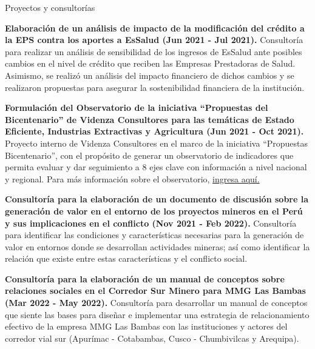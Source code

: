 \documentclass{resume} %
\begin{document}
\begin{rSection}{Proyectos y consultorías}
\item \textbf{Elaboración de un análisis de impacto de la modificación del crédito a la EPS contra los aportes a EsSalud (Jun 2021 - Jul 2021).} {Consultoría para realizar un análisis de sensibilidad de los ingresos de EsSalud ante posibles cambios en el nivel de crédito que reciben las Empresas Prestadoras de Salud. Asimismo, se realizó un análisis del impacto financiero de dichos cambios y se realizaron propuestas para asegurar la sostenibilidad financiera de la institución.}
\item \textbf{Formulación del Observatorio de la iniciativa “Propuestas del Bicentenario” de Videnza Consultores para las temáticas de Estado Eficiente, Industrias Extractivas y Agricultura (Jun 2021 - Oct 2021).} {Proyecto interno de Videnza Consultores en el marco de la iniciativa “Propuestas Bicentenario”, con el propósito de generar un observatorio de indicadores que permita evaluar y dar seguimiento a 8 ejes clave con información a nivel nacional y regional. Para más información sobre el observatorio, \href{https://propuestasdelbicentenario.pe/observatorio/}{ingresa aquí.}}
\item \textbf{Consultoría para la elaboración de un documento de discusión sobre la generación de valor en el entorno de los proyectos mineros en el Perú y sus implicaciones en el conflicto (Nov 2021 - Feb 2022).} {Consultoría para identificar las condiciones y características necesarias para la generación de valor en entornos donde se desarrollan actividades mineras; así como identificar la relación que existe entre estas características y el conflicto social.}
\item \textbf{Consultoría para la elaboración de un manual de conceptos sobre relaciones sociales en el Corredor Sur Minero para MMG Las Bambas (Mar 2022 - May 2022).} {Consultoría para desarrollar un manual de conceptos que siente las bases para diseñar e implementar una estrategia de relacionamiento efectivo de la empresa MMG Las Bambas con las instituciones y actores del corredor vial sur (Apurímac - Cotabambas, Cusco - Chumbivilcas y Arequipa).}
\end{rSection} 
\end{document}

